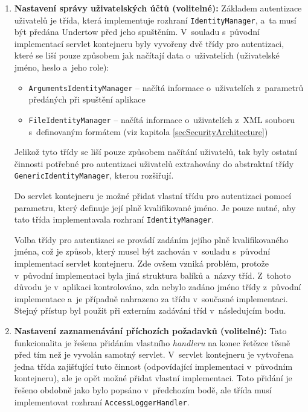 \begin{enumerate}
                \item \textbf{Nastavení správy uživatelských účtů (volitelné):} Základem autentizace
                    uživatelů je třída, která implementuje rozhraní \texttt{IdentityManager}, a~ta musí
                    být předána Undertow před jeho spuštěním. 
                    V~souladu s~původní implementací servlet kontejneru byly vyvořeny dvě třídy pro autentizaci, které
                    se liší pouze způsobem jak načítají data o~uživatelích (uživatelské jméno, heslo a~jeho role):
                    \begin{itemize}
                        \item \texttt{ArgumentsIdentityManager} -- načítá informace o~uživatelích z~parametrů předáných
                            při spuštění aplikace
                        \item \texttt{FileIdentityManager} -- načítá informace o~uživatelích z~XML souboru s~definovaným formátem 
                            (viz kapitola \ref{secSecurityArchitecture})
                    \end{itemize}

                    Jelikož tyto třídy se liší pouze způsobem načítání uživatelů, tak byly ostatní činnosti potřebné pro
                    autentizaci uživatelů extrahovány 
                    do abstraktní třídy \\\texttt{GenericIdentityManager}, kterou rozšiřují.
                        
                    Do servlet kontejneru je možné přidat vlastní třídu pro autentizaci pomocí parametru,
                    který definuje její plně kvalifikované jméno. Je pouze nutné, aby tato třída implementavala
                    rozhraní \texttt{IdentityManager}.

                    Volba třídy pro autentizaci se provádí zadáním jejího plně kvalifikovaného jména, což
                    je způsob, který musel být zachován v~souladu s~původní implementací servlet kontejneru. 
                    Zde ovšem vzniká problém, protože v~původní implementaci byla jiná struktura balíků
                    a~názvy tříd. Z~tohoto důvodu je v~aplikaci kontrolováno, zda nebylo zadáno
                    jméno třídy z~původní implementace a~je případně nahrazeno za třídu v~současné implementaci.
                    Stejný přístup byl použit při externím zadávání tříd v~následujcím bodu.
                
                \item \textbf{Nastavení zaznamenávání příchozích požadavků (volitelné):}
                     Tato funkcionalita je řešena přidáním vlastního \emph{handleru} na konec řetězce 
                     těsně před tím než je vyvolán samotný servlet. V~servlet kontejneru je 
                     vytvořena jedna třída zajišťující tuto činnost (odpovídající implementaci v~původním
                     kontejneru), ale je opět možné přidat vlastní implementaci. Toto přidání
                     je řešeno obdobně jako bylo popsáno v~předchozím bodě, ale
                     třída musí implementovat rozhraní \texttt{AccessLoggerHandler}.
                     

\end{enumerate}
